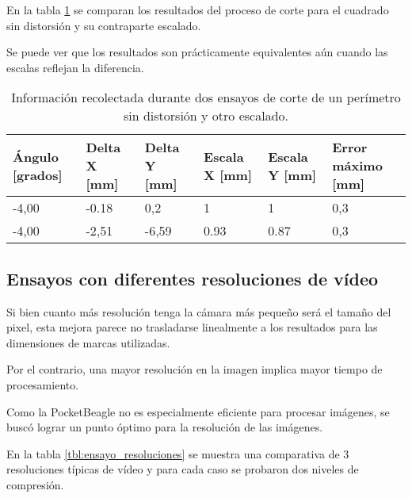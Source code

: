       En la tabla \ref{tbl:ensayo_escalado} se comparan los resultados del proceso de corte para el cuadrado sin distorsión y su contraparte escalado.\par
      Se puede ver que los resultados son prácticamente equivalentes aún cuando las escalas reflejan la diferencia.

      \begin{table}[!ht]
         \centering
         \caption[Ensayos de corte simulado escalado]{Información recolectada durante dos ensayos de corte de un perímetro sin distorsión y otro escalado.}
         \begin{tabular}[!ht]{m{1.6cm}m{1.6cm}m{1.6cm}m{1.6cm}m{1.6cm}m{1.6cm}}
            \toprule
            \textbf{Ángulo [grados]} & \textbf{Delta X [mm]} & \textbf{Delta Y [mm]} & \textbf{Escala X [mm]} & \textbf{Escala Y [mm]} & \textbf{Error máximo [mm]}\\
            \midrule
            {-4,00}& {-0.18}& {0,2}   & {1}    & {1}    & {0,3}\\
            {-4,00}& {-2,51}& {-6,59} & {0.93} & {0.87} & {0,3}\\
            \bottomrule
         \end{tabular}
         \label{tbl:ensayo_escalado}
      \end{table}

\subsection{Ensayos con diferentes resoluciones de vídeo}

Si bien cuanto más resolución tenga la cámara más pequeño será el tamaño del pixel, esta mejora parece no trasladarse linealmente a los resultados para las dimensiones de marcas utilizadas.\par
Por el contrario, una mayor resolución en la imagen implica mayor tiempo de procesamiento.\par
Como la PocketBeagle no es especialmente eficiente para procesar imágenes, se buscó lograr un punto óptimo para la resolución de las imágenes. \par
En la tabla \ref{tbl:ensayo_resoluciones} se muestra una comparativa de 3 resoluciones típicas de vídeo y para cada caso se probaron dos niveles de compresión.\par


